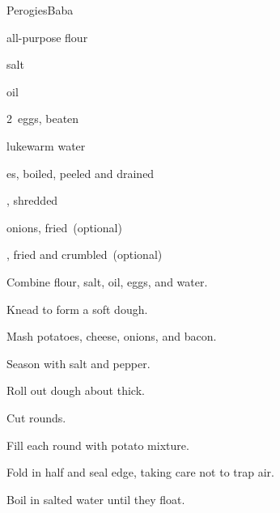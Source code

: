\begin{recipe}{Perogies}{Baba}{}

\begin{ingredients}
\item {} all-purpose flour
\item \tp{1\half} salt
\item {} oil
\item 2~eggs, beaten
\item \C{1\half} lukewarm water
\item \lbs{2\half} es, boiled, peeled and drained
\item \lbs{\half} , shredded
\item onions, fried~(optional)
\item {}, fried and crumbled~(optional)
\end{ingredients}

\begin{directions}
\item Combine flour, salt, oil, eggs, and water.
\item Knead to form a soft dough.
\item Mash potatoes, cheese, onions, and bacon.
\item Season with salt and pepper.
\item Roll out dough about \inch{\eighth} thick.
\item Cut  rounds.
\item Fill each round with potato mixture.
\item Fold in half and seal edge, taking care not to trap air.
\item Boil in salted water until they float.
\end{directions}

\end{recipe}
